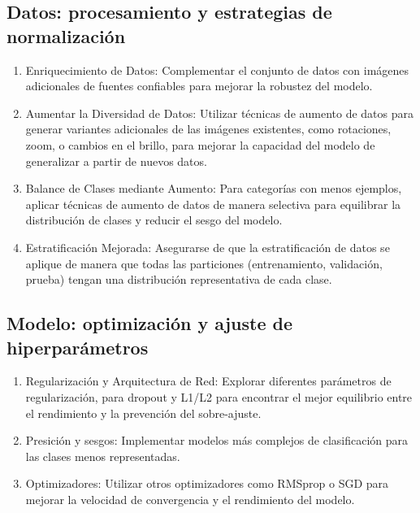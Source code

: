\begin{recomendations}
    \subsection*{Datos: procesamiento y estrategias de normalización}

\begin{enumerate}
    \item Enriquecimiento de Datos: Complementar el conjunto de datos con imágenes adicionales de fuentes confiables para mejorar la robustez del modelo.
    \item Aumentar la Diversidad de Datos: Utilizar técnicas de aumento de datos para generar variantes adicionales de las imágenes existentes, como rotaciones, zoom, o cambios en el brillo, para mejorar la capacidad del modelo de generalizar a partir de nuevos datos.
    \item Balance de Clases mediante Aumento: Para categorías con menos ejemplos, aplicar técnicas de aumento de datos de manera selectiva para equilibrar la distribución de clases y reducir el sesgo del modelo.
    \item Estratificación Mejorada: Asegurarse de que la estratificación de datos se aplique de manera que todas las particiones (entrenamiento, validación, prueba) tengan una distribución representativa de cada clase.
\end{enumerate}

\subsection*{Modelo: optimización y ajuste de hiperparámetros}

\begin{enumerate}
    \item Regularización y Arquitectura de Red: Explorar diferentes parámetros de regularización, para dropout y L1/L2 para encontrar el mejor equilibrio entre el rendimiento y la prevención del sobre-ajuste.
    \item Presición y sesgos: Implementar modelos más complejos de clasificación para las clases menos representadas.
    \item Optimizadores: Utilizar otros optimizadores como RMSprop o SGD para mejorar la velocidad de convergencia y el rendimiento del modelo.
\end{enumerate}

\end{recomendations}
